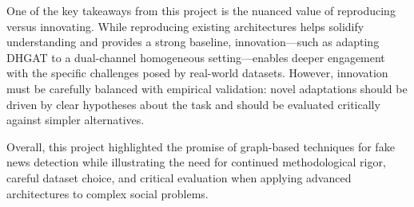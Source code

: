 One of the key takeaways from this project is the nuanced value of reproducing versus innovating. While reproducing existing architectures helps solidify understanding and provides a strong baseline, innovation—such as adapting DHGAT to a dual-channel homogeneous setting—enables deeper engagement with the specific challenges posed by real-world datasets. However, innovation must be carefully balanced with empirical validation: novel adaptations should be driven by clear hypotheses about the task and should be evaluated critically against simpler alternatives.

Overall, this project highlighted the promise of graph-based techniques for fake news detection while illustrating the need for continued methodological rigor, careful dataset choice, and critical evaluation when applying advanced architectures to complex social problems.
